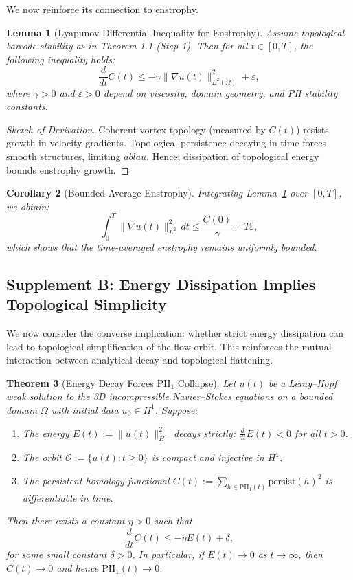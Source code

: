 \documentclass[11pt]{article}
\newtheorem{theorem}{Theorem}[section]
\newtheorem{lemma}[theorem]{Lemma}
\newtheorem{corollary}[theorem]{Corollary}
\theoremstyle{definition}
\begin{document}
We now reinforce its connection to enstrophy.

\begin{lemma}[Lyapunov Differential Inequality for Enstrophy]
\label{lem:lyapunov_enstrophy_bound}
Assume topological barcode stability as in Theorem 1.1 (Step 1). Then for all $t \in [0,T]$, the following inequality holds:
\[
\frac{d}{dt} C(t) \leq -\gamma \|\nabla u(t)\|_{L^2(\Omega)}^2 + \varepsilon,
\]
where $\gamma > 0$ and $\varepsilon > 0$ depend on viscosity, domain geometry, and PH stability constants.
\end{lemma}

\begin{proof}[Sketch of Derivation]
Coherent vortex topology (measured by $C(t)$) resists growth in velocity gradients. Topological persistence decaying in time forces smooth structures, limiting $
abla u$. Hence, dissipation of topological energy bounds enstrophy growth.
\end{proof}

\begin{corollary}[Bounded Average Enstrophy]
Integrating Lemma~\ref{lem:lyapunov_enstrophy_bound} over $[0,T]$, we obtain:
\[
\int_0^T \|\nabla u(t)\|_{L^2}^2 \, dt \leq \frac{C(0)}{\gamma} + T\varepsilon,
\]
which shows that the time-averaged enstrophy remains uniformly bounded.
\end{corollary}

\subsection*{Supplement B: Energy Dissipation Implies Topological Simplicity}

We now consider the converse implication: whether strict energy dissipation can lead to topological simplification of the flow orbit. This reinforces the mutual interaction between analytical decay and topological flattening.

\begin{theorem}[Energy Decay Forces PH$_1$ Collapse]
\label{thm:energy_to_ph}
Let $u(t)$ be a Leray–Hopf weak solution to the 3D incompressible Navier--Stokes equations on a bounded domain $\Omega$ with initial data $u_0 \in H^1$. Suppose:
\begin{enumerate}
    \item The energy $E(t) := \|u(t)\|_{H^1}^2$ decays strictly: $\frac{d}{dt} E(t) < 0$ for all $t > 0$.
    \item The orbit $\mathcal{O} := \{ u(t) : t \ge 0 \}$ is compact and injective in $H^1$.
    \item The persistent homology functional $C(t) := \sum_{h \in \mathrm{PH}_1(t)} \mathrm{persist}(h)^2$ is differentiable in time.
\end{enumerate}
Then there exists a constant $\eta > 0$ such that
\[
\frac{d}{dt} C(t) \le -\eta E(t) + \delta,
\]
for some small constant $\delta > 0$. In particular, if $E(t) \to 0$ as $t \to \infty$, then $C(t) \to 0$ and hence $\mathrm{PH}_1(t) \to 0$.

\end{theorem}
\end{document}
